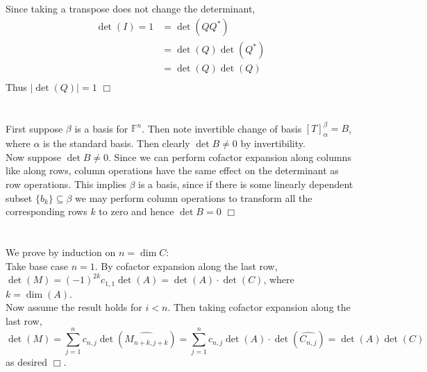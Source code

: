 \documentclass{article}
\begin{document}
\subsection{}
Since taking a transpose does not change the determinant,
\begin{equation*}
  \begin{split}
    \det (I) = 1 &= \det (QQ^*)\\
    &= \det (Q) \det (Q^*)\\
    &= \det (Q) \det (Q)\\
  \end{split}
\end{equation*}
Thus $|\det (Q)| = 1$ $\Box$

\section{}
First suppose $\beta$ is a basis for $\mathbb{F}^n$. Then note invertible change of basis $[T]_\alpha^\beta = B$, where $\alpha$ is the standard basis. Then clearly $\det B \neq 0$ by invertibility.\\
Now suppose $\det B \neq 0$. Since we can perform cofactor expansion along columns like along rows, column operations have the same effect on the determinant as row operations. This implies $\beta$ is a basis, since if there is some linearly dependent subset $\{b_k\} \subseteq \beta$ we may perform column operations to transform all the corresponding rows $k$ to zero and hence $\det B = 0$ $\Box$

\section{}
We prove by induction on $n = \dim C$:\\
Take base case $n = 1$. By cofactor expansion along the last row, $\det(M) = (-1)^{2k}c_{1,1}\det(A) = \det(A)\cdot\det(C)$, where $k = \dim(A)$.\\
Now assume the result holds for $i<n$. Then taking cofactor expansion along the last row,
$$\det(M) = \sum\limits_{j=1}^{n} c_{n,j} \det(\widehat{M_{n+k,j+k}}) = \sum\limits_{j=1}^{n} c_{n,j} \det(A)\cdot\det(\widehat{C_{n,j}}) = \det(A)\det(C)$$
as desired $\Box$.
\end{document}
